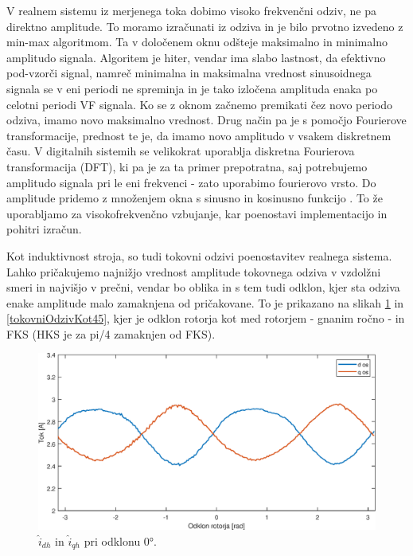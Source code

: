 \documentclass[a4paper,twoside,openright,12pt,slovene]{book}
\begin{document}
V realnem sistemu iz merjenega toka dobimo visoko frekvenčni odziv, ne pa direktno amplitude. To moramo izračunati iz odziva in je bilo prvotno izvedeno z min-max algoritmom. Ta v določenem oknu 
odšteje maksimalno in minimalno amplitudo signala. Algoritem je hiter, vendar ima slabo lastnost, da efektivno pod-vzorči signal, namreč minimalna in maksimalna vrednost sinusoidnega signala se v eni
periodi ne spreminja in je tako izločena amplituda enaka po celotni periodi VF signala. Ko se z oknom začnemo premikati čez novo periodo odziva, imamo novo maksimalno vrednost.
Drug način pa je s pomočjo Fourierove transformacije, prednost te je, da imamo novo amplitudo v vsakem diskretnem času. V digitalnih sistemih se velikokrat
uporablja diskretna Fourierova transformacija (DFT), ki pa je za ta primer prepotratna, saj potrebujemo amplitudo signala pri le eni frekvenci - zato uporabimo fourierovo vrsto. Do amplitude pridemo z 
množenjem okna s sinusno in kosinusno funkcijo \cite{enwiki:fourierSeries}. To že uporabljamo za visokofrekvenčno vzbujanje, kar poenostavi implementacijo in pohitri izračun.

Kot induktivnost stroja, so tudi tokovni odzivi poenostavitev realnega sistema. Lahko pričakujemo najnižjo vrednost amplitude tokovnega odziva v vzdolžni smeri in najvišjo v prečni, vendar bo oblika
in s tem tudi odklon, kjer sta odziva enake amplitude malo zamaknjena od pričakovane. To je prikazano na slikah \ref{tokovniOdzivKot0} in \ref{tokovniOdzivKot45}, kjer je odklon rotorja kot med
rotorjem - gnanim ročno - in FKS (HKS je za pi/4 zamaknjen od FKS).

\begin{figure}[!htbp]
    \centering
    \includegraphics[width=0.95\columnwidth]{Slike/tokovniOdzivKot0.eps}
    \caption{\label{tokovniOdzivKot0} $\hat{i}_{dh}$ in $\hat{i}_{qh}$ pri odklonu 0°.}
\end{figure}
\end{document}

